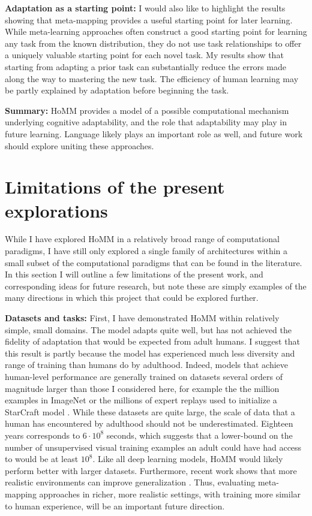 \textbf{Adaptation as a starting point:} I would also like to highlight the results showing that meta-mapping provides a useful starting point for later learning. While meta-learning approaches often construct a good starting point for learning any task from the known distribution, they do not use task relationships to offer a uniquely valuable starting point for each novel task. My results show that starting from adapting a prior task can substantially reduce the errors made along the way to mastering the new task. The efficiency of human learning may be partly explained by adaptation before beginning the task. \par 

\textbf{Summary:} HoMM provides a model of a possible computational mechanism underlying cognitive adaptability, and the role that adaptability may play in future learning. Language likely plays an important role as well, and future work should explore uniting these approaches. 

\section{Limitations of the present explorations}

While I have explored HoMM in a relatively broad range of computational paradigms, I have still only explored a single family of architectures within a small subset of the computational paradigms that can be found in the literature. In this section I will outline a few limitations of the present work, and corresponding ideas for future research, but note these are simply examples of the many directions in which this project that could be explored further. \par

\textbf{Datasets and tasks:} First, I have demonstrated HoMM within relatively simple, small domains. The model adapts quite well, but has not achieved the fidelity of adaptation that would be expected from adult humans. I suggest that this result is partly because the model has experienced much less diversity and range of training than humans do by adulthood. Indeed, models that achieve human-level performance are generally trained on datasets several orders of magnitude larger than those I considered here, for example the the million examples in ImageNet \citep{Deng2009} or the millions of expert replays used to initialize a StarCraft model \citep{Vinyals2019}. While these datasets are quite large, the scale of data that a human has encountered by adulthood should not be underestimated. Eighteen years corresponds to \(6 \cdot 10^8\) seconds, which suggests that a lower-bound on the number of unsupervised visual training examples an adult could have had access to would be at least \(10^8\). Like all deep learning models, HoMM would likely perform better with larger datasets. Furthermore, recent work shows that more realistic environments can improve generalization \citep{Hill2019a}. Thus, evaluating meta-mapping approaches in richer, more realistic settings, with training more similar to human experience, will be an important future direction. \par


